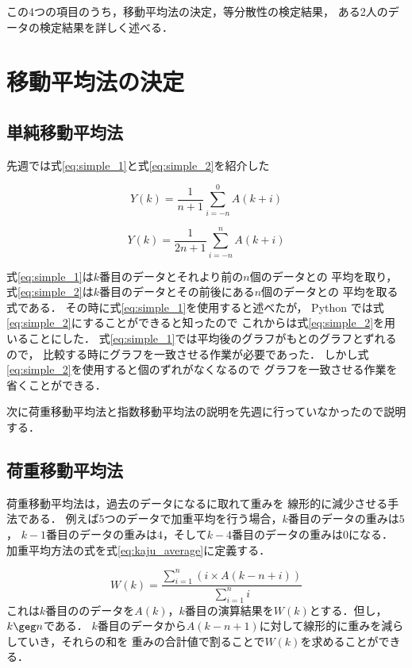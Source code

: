 この4つの項目のうち，移動平均法の決定，等分散性の検定結果，
ある2人のデータの検定結果を詳しく述べる．
\section{移動平均法の決定}

\subsection{単純移動平均法}

先週では式\ref{eq:simple_1}と式\ref{eq:simple_2}を紹介した

\begin{equation}
    Y(k) = \frac{1}{n + 1}\sum_{i=-n}^{0}A(k + i)
    \label{eq:simple_1}
\end{equation}

\begin{equation}
    Y(k) = \frac{1}{2n + 1}\sum_{i=-n}^{n}A(k + i)
    \label{eq:simple_2}
\end{equation}

式\ref{eq:simple_1}は$k$番目のデータとそれより前の$n$個のデータとの
平均を取り，式\ref{eq:simple_2}は$k$番目のデータとその前後にある$n$個のデータとの
平均を取る式である．
その時に式\ref{eq:simple_1}を使用すると述べたが，
Python では式\ref{eq:simple_2}にすることができると知ったので
これからは式\ref{eq:simple_2}を用いることにした．
式\ref{eq:simple_1}では平均後のグラフがもとのグラフとずれるので，
比較する時にグラフを一致させる作業が必要であった．
しかし式\ref{eq:simple_2}を使用すると個のずれがなくなるので
グラフを一致させる作業を省くことができる．

次に荷重移動平均法と指数移動平均法の説明を先週に行っていなかったので説明する．

\subsection{荷重移動平均法}

荷重移動平均法は，過去のデータになるに取れて重みを
線形的に減少させる手法である．
例えば$5$つのデータで加重平均を行う場合，$k$番目のデータの重みは$5$，
$k - 1$番目のデータの重みは$4$，そして$k - 4$番目のデータの重みは$0$になる．
加重平均方法の式を式\ref{eq:kaju_average}に定義する．

\begin{equation}
    W(k) = \frac{\sum_{i=1}^{n}(i \times A(k - n + i))}{\sum_{i = 1}^{n}i}
    \label{eq:kaju_average}
\end{equation}
これは$k$番目ののデータを$A(k)$，$k$番目の演算結果を$W(k)$とする．但し，$k \geg n$である．
$k$番目のデータから$A(k - n + 1)$に対して線形的に重みを減らしていき，それらの和を
重みの合計値で割ることで$W(k)$を求めることができる．

